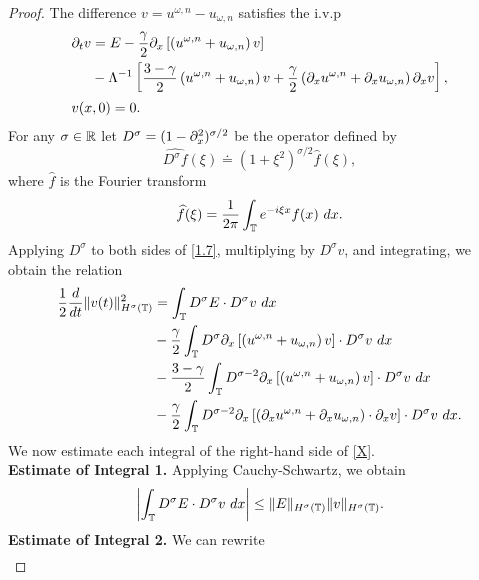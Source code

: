 \begin{proof} The difference $v = u^{\omega,n} - u_{\omega,n}$ satisfies 
the i.v.p
\begin{align}
\label{1.7}
& \p_t v  =  E - \frac{\gamma}{2} \p_x
\left[ \left( u^{\omega,n} + u_{\omega,n} \right)v \right]
\\
\notag & \phantom{\p_t v} - \Lambda^{-1} \left[
\frac{3-\gamma}{2} \left( u^{\omega,n} + u_{\omega,n}
\right) v +
\frac{\gamma}{2}\left( \p_x u^{\omega,n} +
\p_x u_{\omega,n}
\right) \p_x v
\right], \\
& v(x,0)=0.
\end{align}
For any $\sigma \in \mathbb{R}$ let   $D^\sigma=(1-\partial_x^2)^{\sigma/2}$ be the  operator
defined by 
%
$$ \widehat{D^\sigma f}(\xi) \doteq (1 + \xi^2)^{\sigma/2} \widehat{f}(\xi), $$
%
where $ \widehat{f}$ is the Fourier transform
%
$$ \widehat{f}(\xi) =  \frac{1}{2\pi}\int_{\mathbb{T}} e^{-i \xi x} f(x) \ dx.  $$
%
%
Applying $D^\sigma$ to both sides of \eqref{1.7}, multiplying by
$D^\sigma v$, and integrating, we obtain the
relation
%
%
\begin{equation}
\begin{split}
\frac{1}{2}\frac{d}{dt}\|v(t)\|_{H^\sigma(\mathbb{T})}^2
& = \int_{\mathbb{T}} D^\sigma E \cdot D^\sigma
v \ dx
\\
&-
\frac{\gamma}{2}\int_{\mathbb{T}} D^\sigma
\partial_x \left[ \left( u^{\omega,n} + u_{\omega,n} \right)v
\right]\cdot D^\sigma v \ dx
\\
& -
\frac{3-\gamma}{2}\int_{\mathbb{T}} D^{\sigma
-2} \partial_x \left[ \left( u^{\omega,n} + u_{\omega,n}
\right)v \right] \cdot D^\sigma v \ dx
\\
& - \frac{\gamma}{2}\int_{\mathbb{T}} D^{\sigma
-2}
\partial_x \left[ \left( \partial_x u^{\omega,n} + \partial_x u_{\omega,n}
\right)\cdot \partial_x v \right] \cdot
D^\sigma v \ dx.
\label{X}
\end{split}
\end{equation}
%
%
We now estimate each integral of the right-hand side
of \eqref{X}.
\\
\textbf{Estimate of Integral 1.} Applying Cauchy-Schwartz, we obtain
%
%
\begin{equation}
\begin{split}
\left |\int_{\mathbb{T}} D^\sigma E \cdot D^\sigma v \ dx \right |
\le \|E\|_{H^\sigma(\mathbb{T})} \|v\|_{H^\sigma(\mathbb{T})}.
\label{est_for_1}
\end{split}
\end{equation}
%
%
%
\textbf{Estimate of Integral 2.} We can rewrite
%
%
\begin{equation}
\begin{split}

\end{split}
\end{equation}
\end{proof}
